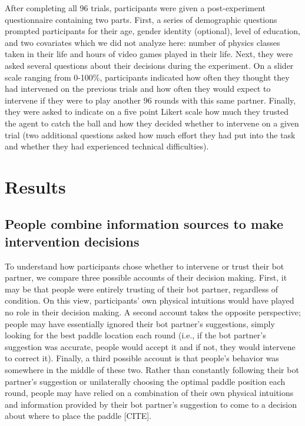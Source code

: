 \documentclass[10pt,letterpaper]{article}
\begin{document}
After completing all 96 trials, participants were given a post-experiment questionnaire containing two parts. First, a series of demographic questions prompted participants for their age, gender identity (optional), level of education, and two covariates which we did not analyze here: number of physics classes taken in their life and hours of video games played in their life. Next, they were asked several questions about their decisions during the experiment. On a slider scale ranging from 0-100\%, participants indicated how often they thought they had intervened on the previous trials and how often they would expect to intervene if they were to play another 96 rounds with this same partner. Finally, they were asked to indicate on a five point Likert scale how much they trusted the agent to catch the ball and how they decided whether to intervene on a given trial (two additional questions asked how much effort they had put into the task and whether they had experienced technical difficulties).



\section{Results}

\subsection{People combine information sources to make intervention decisions}

To understand how participants chose whether to intervene or trust their bot partner, we compare three possible accounts of their decision making. First, it may be that people were entirely trusting of their bot partner, regardless of condition. On this view, participants' own physical intuitions would have played no role in their decision making. A second account takes the opposite perspective; people may have essentially ignored their bot partner's suggestions, simply looking for the best paddle location each round (i.e., if the bot partner's suggestion was accurate, people would accept it and if not, they would intervene to correct it). Finally, a third possible account is that people's behavior was somewhere in the middle of these two. Rather than constantly following their bot partner's suggestion or unilaterally choosing the optimal paddle position each round, people may have relied on a combination of their own physical intuitions and information provided by their bot partner's suggestion to come to a decision about where to place the paddle [CITE]. 
\end{document}
